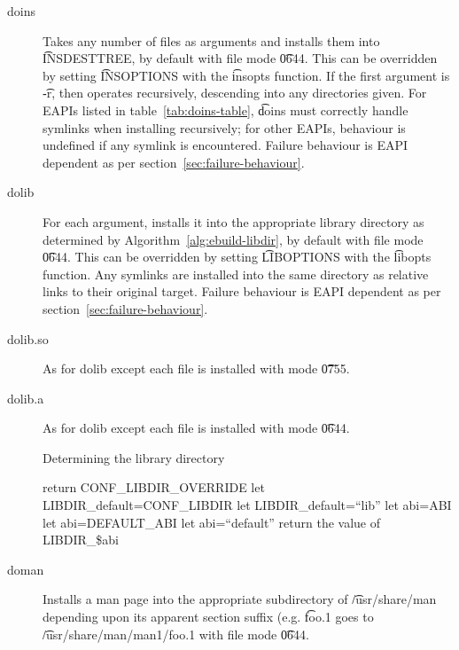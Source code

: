 \begin{description}
\item[doins]  Takes any number of files as arguments and installs them into
    \t{INSDESTTREE}, by default with file mode \t{0644}. This can be overridden by setting
    \t{INSOPTIONS} with the \t{insopts} function. If the first argument is \t{-r}, then operates
    recursively, descending into any directories given. For EAPIs listed in
    table~\ref{tab:doins-table}, \t{doins} must correctly handle symlinks when installing
    recursively; for other EAPIs, behaviour is undefined if any symlink is encountered. Failure
    behaviour is EAPI dependent as per section~\ref{sec:failure-behaviour}.

\item[dolib] For each argument, installs it into the appropriate library directory as determined by
    Algorithm~\ref{alg:ebuild-libdir}, by default with file mode \t{0644}. This can be overridden by
    setting \t{LIBOPTIONS} with the \t{libopts} function. Any symlinks are installed into the same
    directory as relative links to their original target. Failure behaviour is EAPI dependent as per
    section~\ref{sec:failure-behaviour}.

\item[dolib.so] As for dolib except each file is installed with mode \t{0755}.

\item[dolib.a] As for dolib except each file is installed with mode \t{0644}.

\begin{algorithm}
\caption{Determining the library directory} \label{alg:ebuild-libdir}
\begin{algorithmic}[1]
    \STATE return CONF\_LIBDIR\_OVERRIDE
\ENDIF
{}
    \STATE let LIBDIR\_default=CONF\_LIBDIR
\ELSE
    \STATE let LIBDIR\_default=``lib''
\ENDIF
{}
    \STATE let abi=ABI
    \STATE let abi=DEFAULT\_ABI
\ELSE
    \STATE let abi=``default''
\ENDIF
\STATE return the value of LIBDIR\_\$abi
\end{algorithmic}
\end{algorithm}

\item[doman] Installs a man page into the appropriate subdirectory of \t{/usr/share/man} depending
    upon its apparent section suffix (e.g. \t{foo.1} goes to \t{/usr/share/man/man1/foo.1} with file
    mode \t{0644}.


\end{description}
